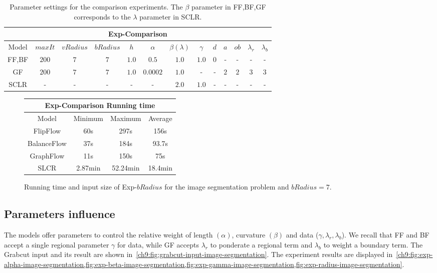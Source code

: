 \begin{table}
\centering
\begin{tabular}{|c|c|c|c|c|c|c|c|c|c|c|c|c|}
\hline
\multicolumn{13}{|c|}{Exp-Comparison}\\
\hline
Model & $maxIt$ & $vRadius$ & $bRadius$ & $h$ & $\alpha$ & $\beta (\lambda)$  & $\gamma$ & $d$ & $a$ & $ob$ & $\lambda_r$ & $\lambda_b$ \\
\hline
FF,BF & $200$ & $7$ & $7$ & $1.0$ & $0.5$ & $1.0$ & $1.0$ & $0$ & - & - & - & -\\
\hline
GF & $200$ & $7$ & $7$ & $1.0$ & $0.0002$ & $1.0$ & - & - & $2$ & $2$ & $3$ & $3$\\
\hline
SCLR & - & - & - & - & - & $2.0$ & $1.0$ & - & - & - & - & -\\
\hline
\end{tabular}
\caption{Parameter settings for the comparison experiments. The $\beta$ parameter in FF,BF,GF corresponds to the $\lambda$ parameter in SCLR.}
\label{ch9:tab:image-segmentation-comparison-summary}
\end{table}

\begin{figure}
\center
\captionsetup{type=table}
\begin{tabular}{|c|c|c|c|}
\hline
\multicolumn{4}{|c|}{Exp-Comparison Running time}\\
\hline
Model & Minimum & Maximum & Average \\
\hline
FlipFlow & 60s & 297s & 156s\\
BalanceFlow & 37s & 184s & 93.7s\\
GraphFlow & 11s & 150s & 75s\\
SLCR & 2.87min & 52.24min & 18.4min\\
\hline
\end{tabular}
\caption{Running time and input size of Exp-$bRadius$ for the image segmentation problem and $bRadius=7$.}
\label{ch9:tab:rtime-image-segmentation-general} 
\end{figure}

\subsection{Parameters influence}
The models offer parameters to control the relative weight of length $(\alpha)$, curvature $(\beta)$ and data ($\gamma,\lambda _r, \lambda _b$). We recall that FF and BF accept a single regional parameter $\gamma$ for data, while GF accepts $\lambda _r$ to ponderate a regional term and $\lambda _b$ to weight a boundary term. The Grabcut input and its result are shown in~\cref{ch9:fig:grabcut-input-image-segmentation}. The experiment results are displayed in~\cref{ch9:fig:exp-alpha-image-segmentation,fig:exp-beta-image-segmentation,fig:exp-gamma-image-segmentation,fig:exp-radius-image-segmentation}. 

